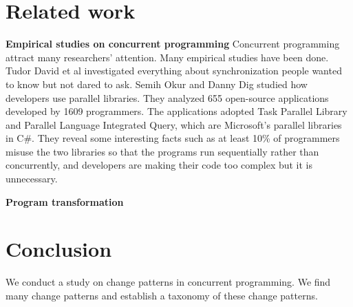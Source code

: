 \documentclass[conference]{IEEEtran}
\begin{document}
\section{Related work}
\textbf{Empirical studies on concurrent programming}
Concurrent programming attract many researchers' attention. Many empirical studies have been done. Tudor David et al \cite{conf/sosp/DavidGT13} investigated everything about synchronization people wanted to know but not dared to ask. Semih Okur and Danny Dig \cite{conf/sigsoft/OkurD12} studied how developers use parallel libraries. They analyzed 655 open-source applications developed by 1609 programmers. The applications adopted Task Parallel Library and Parallel Language Integrated Query, which are Microsoft's parallel libraries in C\#. They reveal some interesting facts such as at least 10\% of programmers misuse the two libraries so that the programs run sequentially rather than concurrently, and developers are making their code too complex but it is unnecessary.

\textbf{Program transformation}

\section{Conclusion}
We conduct a study on change patterns in concurrent programming. We find many change patterns and establish a taxonomy of these change patterns.


%
%
\end{document}
